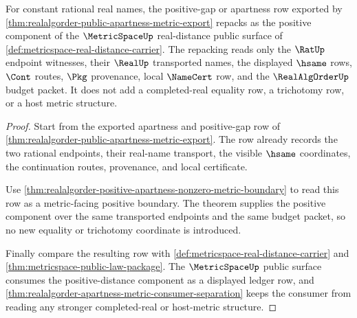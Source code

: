 \begin{theorem}
\label{thm:realalgorder-metricspace-public-positive-distance-handoff}
For constant rational real names, the positive-gap or apartness row exported by
\autoref{thm:realalgorder-public-apartness-metric-export} repacks as the
positive component of the $\MetricSpaceUp$ real-distance public surface of
\autoref{def:metricspace-real-distance-carrier}. The repacking reads only the
$\RatUp$ endpoint witnesses, their $\RealUp$ transported names, the displayed
$\hsame$ rows, $\Cont$ routes, $\Pkg$ provenance, local $\NameCert$ row, and the
$\RealAlgOrderUp$ budget packet. It does not add a completed-real equality row,
a trichotomy row, or a host metric structure.
\end{theorem}
\begin{proof}
Start from the exported apartness and positive-gap row of
\autoref{thm:realalgorder-public-apartness-metric-export}. The row already
records the two rational endpoints, their real-name transport, the visible
$\hsame$ coordinates, the continuation routes, provenance, and local
certificate.

Use \autoref{thm:realalgorder-positive-apartness-nonzero-metric-boundary} to
read this row as a metric-facing positive boundary. The theorem supplies the
positive component over the same transported endpoints and the same budget
packet, so no new equality or trichotomy coordinate is introduced.

Finally compare the resulting row with
\autoref{def:metricspace-real-distance-carrier} and
\autoref{thm:metricspace-public-law-package}. The $\MetricSpaceUp$ public
surface consumes the positive-distance component as a displayed ledger row, and
\autoref{thm:realalgorder-apartness-metric-consumer-separation} keeps the
consumer from reading any stronger completed-real or host-metric structure.
\end{proof}

